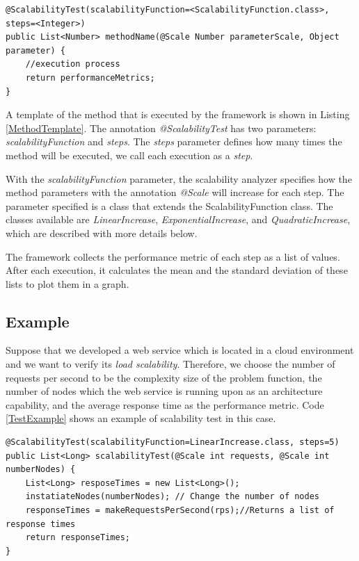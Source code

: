 \begin{lstlisting}
@ScalabilityTest(scalabilityFunction=<ScalabilityFunction.class>, steps=<Integer>)
public List<Number> methodName(@Scale Number parameterScale, Object parameter) {
	//execution process
	return performanceMetrics;
}

\end{lstlisting}

A template of the method that is executed by the framework is shown in Listing \ref{MethodTemplate}. The annotation \emph{@ScalabilityTest} has two parameters: \emph{scalabilityFunction} and \emph{steps}. The \emph{steps} parameter defines how many times the method will be executed, we call each execution as a \emph{step}.

With the \emph{scalabilityFunction} parameter, the scalability analyzer specifies how the method parameters with the annotation \emph{@Scale} will increase for each step. The parameter specified is a class that extends the ScalabilityFunction class. The classes available are \emph{LinearIncrease}, \emph{ExponentialIncrease}, and \emph{QuadraticIncrease}, which are described with more details below.

The framework collects the performance metric of each step as a list of values. After each execution, it calculates the mean and the standard deviation of these lists to plot them in a graph.

\subsection{Example}

Suppose that we developed a web service which is located in a cloud environment and we want to verify its \emph{load scalability}. Therefore, we choose the number of requests per second to be the complexity size of the problem function, the number of nodes which the web service is running upon as an architecture capability, and the average response time as the performance metric. Code \ref{TestExample} shows an example of scalability test in this case.
\begin{lstlisting}
@ScalabilityTest(scalabilityFunction=LinearIncrease.class, steps=5)
public List<Long> scalabilityTest(@Scale int requests, @Scale int numberNodes) {
	List<Long> resposeTimes = new List<Long>();
	instatiateNodes(numberNodes); // Change the number of nodes
	responseTimes = makeRequestsPerSecond(rps);//Returns a list of response times
	return responseTimes;
}
\end{lstlisting}

